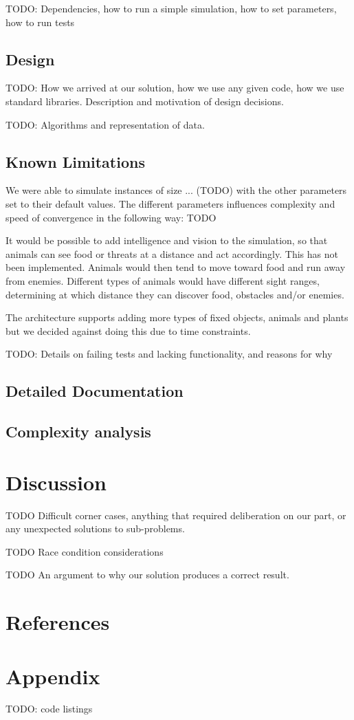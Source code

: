 \documentclass[12pt]{article}
\begin{document}
TODO: Dependencies, how to run a simple simulation, how to set parameters, how to run tests

\subsection{Design}

TODO: How we arrived at our solution, how we use any given code, how we use standard libraries. Description and motivation of design decisions.

TODO: Algorithms and representation of data.

\subsection{Known Limitations}

We were able to simulate instances of size ... (TODO) with the other parameters set to their default values. The different parameters influences complexity and speed of convergence in the following way: TODO

It would be possible to add intelligence and vision to the simulation, so that animals can see food or threats at a distance and act accordingly. This has not been implemented. Animals would then tend to move toward food and run away from enemies. Different types of animals would have different sight ranges, determining at which distance they can discover food, obstacles and/or enemies.

The architecture supports adding more types of fixed objects, animals and plants but we decided against doing this due to time constraints.

TODO: Details on failing tests and lacking functionality, and reasons for why

\subsection{Detailed Documentation} %

\subsection{Complexity analysis}

\section{Discussion}

TODO Difficult corner cases, anything that required deliberation on our part, or any unexpected solutions to sub-problems.

TODO Race condition considerations

TODO An argument to why our solution produces a correct result.

\section{References}

\section{Appendix}

TODO: code listings
\end{document}

